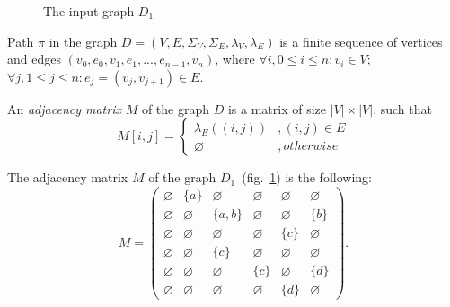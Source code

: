 \begin{figure}[h]
    \centering
    \caption{The input graph $D_1$}
    \label{fig:example_input_graph}
\end{figure}

\begin{definition}
Path $\pi$ in the graph $D=(V, E, \Sigma_V, \Sigma_E, \lambda_V, \lambda_E)$ is a finite sequence of vertices and edges $(v_0, e_0, v_1, e_1, ..., e_{n-1}, v_{n})$, where $\forall i, 0 \leq i \leq n: v_i \in V$; $\forall j, 1 \leq j \leq n: e_j=(v_j, v_{j+1}) \in E$.
\end{definition}

\begin{definition}
An \emph{adjacency matrix} $M$ of the graph $D$ is a matrix of size  $|V|\times|V|$, such that
\begin{equation*}
M[i,j] =
 \begin{cases}
   \lambda_E((i, j))&, (i, j) \in E\\
   \varnothing&, otherwise
 \end{cases}
\end{equation*} 
\end{definition}

The adjacency matrix $M$ of the graph $D_1$~(fig.~\ref{fig:example_input_graph}) is the following:
{
    \renewcommand{\arraystretch}{0.5}
    \setlength\arraycolsep{1.5pt}
$$
    M =
    \begin{pmatrix}
    \varnothing     & \{a\} &   \varnothing      &   \varnothing   &   \varnothing   &   \varnothing   \\
    \varnothing     &   \varnothing   & \{a, b\} &   \varnothing   &    \varnothing  & \{b\} \\
    \varnothing     &   \varnothing   &   \varnothing      &   \varnothing   & \{c\} &   \varnothing   \\
    \varnothing     &   \varnothing   & \{c\}    &   \varnothing   &   \varnothing   &   \varnothing   \\
    \varnothing     &   \varnothing   &   \varnothing      & \{c\} &   \varnothing   & \{d\} \\
    \varnothing     & \varnothing     &   \varnothing      &   \varnothing   & \{d\} &   \varnothing
    \end{pmatrix}.
$$
}

